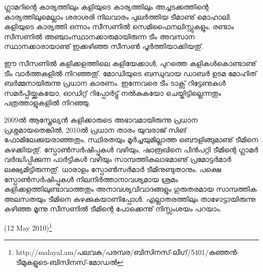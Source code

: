 ഗ്ലാമറിന്റെ കാര്യത്തിലും കളിയുടെ കാര്യത്തിലും അച്ചടക്കത്തിന്റെ കാര്യത്തിലുമെല്ലാം ശരാശരി നിലവാരം പുലര്‍ത്തിയ 
ടീമാണു് മൊഹാലി. കളിയുടെ കാര്യത്തി ഒന്നാം സീസണില്‍ സെമിഫൈനലിസ്റ്റുകളും, രണ്ടാം സീസണില്‍ 
അഞ്ചാംസ്ഥാനക്കാരുമായിരുന്ന ടീം അവസാന സ്ഥാനക്കാരായാണു് ഇക്കഴിഞ്ഞ സീസണ്‍ പൂര്‍ത്തിയാക്കിയതു്.

ഈ സീസണില്‍ കളിക്കളത്തിലെ കളിയേക്കാള്‍, പുറത്തെ കളികള്‍കൊണ്ടാണു് ടീം വാര്‍ത്തകളില്‍ നിറഞ്ഞതു്. 
മോഡിയുടെ ബന്ധുവായ ഡാബര്‍ ഉടമ മോഹിത് ബര്‍മ്മനായിരുന്നു പ്രധാന കാരണം. ഇന്നേവരെ ടീം ടാക്സ് റിട്ടേണുകള്‍ 
സമര്‍പ്പിയ്ക്കുകയോ, ഓഡിറ്റ് റിപ്പോര്‍ട്ടു് നല്‍കുകയോ ചെയ്തിട്ടില്ലെന്നതും പത്രത്താളുകളില്‍ നിറഞ്ഞു.

2009ല്‍ ആസ്ത്രേല്യന്‍ കളിക്കാരുടെ അഭാവമായിരുന്നു പ്രധാന പ്രശ്നമായതെങ്കില്‍, 2010ല്‍ പ്രധാന താരം യുവരാജ് സിങ് 
ഫോമിലേക്കുയരാഞ്ഞതും, സ്ഥിരതയും മൂര്‍ച്ചയുമില്ലാത്ത ബൌളിങ്ങുമാണു് ടീമിനെ കുഴക്കിയതു്. സ്പോണ്‍സര്‍ഷിപ്പുകള്‍ വഴിയും, 
ഷാരൂഖിനെ പിന്‍പറ്റി ടീമിന്റെ ഗ്ലാമര്‍ വര്‍ദ്ധിപ്പിക്കുന്ന പാര്‍ട്ടികള്‍ വഴിയും സാമ്പത്തികലാഭമാണു് പ്രമോട്ടര്‍മാര്‍ ലക്ഷ്യമിട്ടിരുന്നതു്. 
ധാരാളം സ്പോണ്‍സര്‍മാര്‍ ടീമിനുണ്ടുതാനും. പക്ഷെ സ്പോണ്‍സര്‍ഷിപ്പുകള്‍ നിലനിര്‍ത്താനാവശ്യമായ ശ്രമം 
കളിക്കളത്തിലുണ്ടാവാത്തതും അനാവശ്യവിവാദങ്ങളും ഗുരുതരമായ സാമ്പത്തിക അലസതയും ടീമിനെ കുഴക്കുകയാണിപ്പോള്‍. 
എല്ലാതരത്തിലും താഴോട്ടായിരുന്നു കഴിഞ്ഞ മൂന്നു സീസണില്‍ ടീമിന്റെ പോക്കെന്നു് നിസ്സംശയം പറയാം.

(12 May 2010)\footnote{http://malayal.am/പലവക/പരമ്പര/ബിസിനസ്-ലീഗ്/5401/കുഞ്ഞന്‍-ടീമുകളുടെ-ബിസിനസ്-മോഡല്‍}

\newpage
